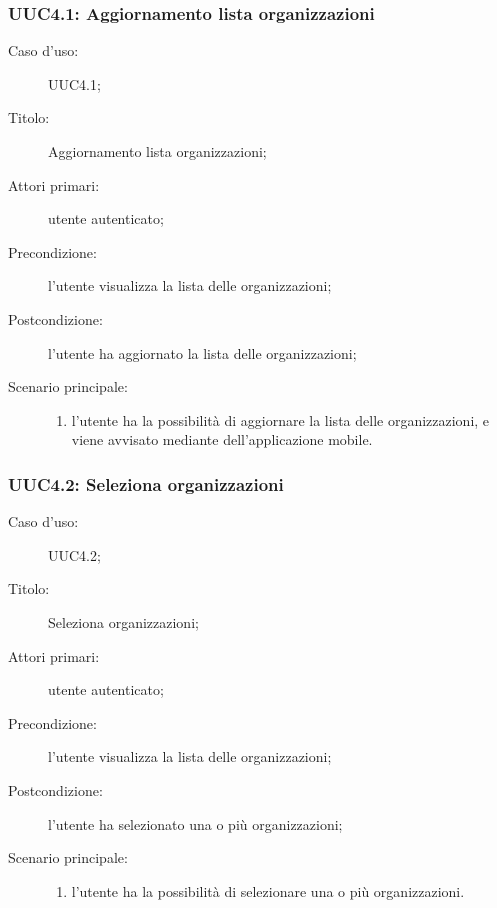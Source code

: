 \documentclass[../../../analisi-dei-requisiti.tex]{subfiles}
\begin{document}
\subsubsection{UUC4.1: Aggiornamento lista organizzazioni}%
\label{subs:UUC4.1}
\begin{description}
  \item[Caso d’uso:] UUC4.1;
  \item[Titolo:] Aggiornamento lista organizzazioni;
  \item[Attori primari:] utente autenticato;
  \item[Precondizione:] l'utente visualizza la lista delle organizzazioni;
  \item[Postcondizione:] l'utente ha aggiornato la lista delle organizzazioni;
  \item[Scenario principale:]
        \begin{enumerate}
          \item l'utente ha la possibilità di aggiornare la lista delle organizzazioni, e viene avvisato mediante  dell'applicazione mobile.
        \end{enumerate}
\end{description}



\subsubsection{UUC4.2: Seleziona organizzazioni}%
\label{subs:UUC4.1}
\begin{description}
  \item[Caso d’uso:] UUC4.2;
  \item[Titolo:] Seleziona organizzazioni;
  \item[Attori primari:] utente autenticato;
  \item[Precondizione:] l'utente visualizza la lista delle organizzazioni;
  \item[Postcondizione:] l'utente ha selezionato una o più organizzazioni;
  \item[Scenario principale:]
        \begin{enumerate}
          \item l'utente ha la possibilità di selezionare una o più organizzazioni.
        \end{enumerate}
\end{description}
\end{document}
